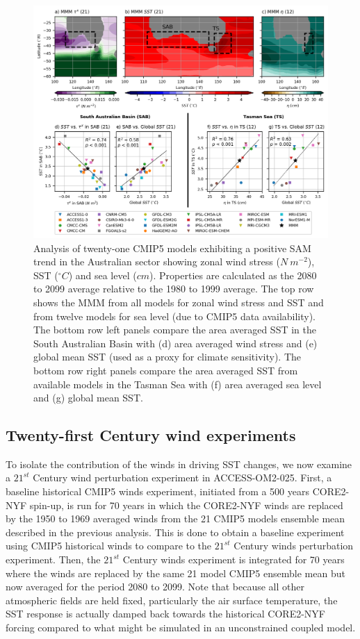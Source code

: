 \documentclass[draft,linenumbers]{agujournal2018}
\begin{document}
\begin{figure}[h]
\centering
\includegraphics[trim={0 0 0 0},clip, width=1\textwidth]{p26_fig2_.png}
\caption{Analysis of twenty-one CMIP5 models exhibiting a positive SAM trend in the Australian sector showing zonal wind stress ($N\ m^{-2}$), SST ($^{\circ}C$) and sea level ($cm$). Properties are calculated as the 2080 to 2099 average relative to the 1980 to 1999 average. The top row shows the MMM from all models for zonal wind stress and SST and from twelve models for sea level (due to CMIP5 data availability). The bottom row left panels compare the area averaged SST in the South Australian Basin with (d) area averaged wind stress and (e) global mean SST (used as a proxy for climate sensitivity). The bottom row right panels compare the area averaged SST from available models in the Tasman Sea with (f) area averaged sea level and (g) global mean SST.}\label{p26_fig1_}
\end{figure}


\subsection{Twenty-first Century wind experiments} \label{Twenty-first Century winds experiment}
To isolate the contribution of the winds in driving SST changes, we now examine a $21^{st}$ Century wind perturbation experiment in ACCESS-OM2-025. First, a baseline historical CMIP5 winds experiment, initiated from a 500 years CORE2-NYF spin-up, is run for 70 years in which the CORE2-NYF winds are replaced by the 1950 to 1969 averaged winds from the 21 CMIP5 models ensemble mean described in the previous analysis. This is done to obtain a baseline experiment using CMIP5 historical winds to compare to the $21^{st}$ Century winds perturbation experiment. Then, the $21^{st}$ Century winds experiment is integrated for 70 years where the winds are replaced by the same 21 model CMIP5 ensemble mean but now averaged for the period 2080 to 2099. Note that because all other atmospheric fields are held fixed, particularly the air surface temperature, the SST response is actually damped back towards the historical CORE2-NYF forcing compared to what might be simulated in an unconstrained coupled model.
\end{document}
